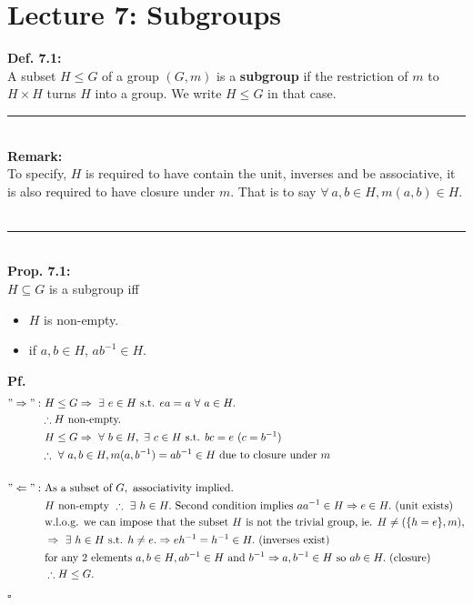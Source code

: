 \documentclass{article}
\begin{document}
\section{Lecture 7: Subgroups}
\textbf{Def. 7.1:}\\
A subset $H\leq G$ of a group $(G,m)$ is a \textbf{subgroup} if the restriction of $m$ to $H\times H$ turns $H$ into a group. We write $H\leq  G$ in that case.
\vspace{2mm}~\\
\hrule
\vspace{2mm}~\\
\textbf{Remark:}\\
To specify, $H$ is required to have contain the unit, inverses and be associative, it is also required to have closure under $m$. That is to say $\forall ~a,b\in H,m(a,b)\in H$.
\vspace{2mm}~\\
\hrule
\vspace{2mm}~\\
\textbf{Prop. 7.1:}\\
$H\subseteq G$ is a subgroup iff
\begin{itemize}
\item $H$ is non-empty.
\item if $a,b\in H$, $ab^{-1}\in H$.
\end{itemize}
\textbf{Pf.}
\begin{align*}
"\Rightarrow":&~H\leq G\Rightarrow ~\exists~ e\in H\text{ s.t. } ea=a~\forall~a\in H.\\
&\therefore H\text{ non-empty.}\\
&~H\leq G\Rightarrow ~\forall ~ b\in H,~\exists~c\in H\text{ s.t. }bc=e~(c=b^{-1})\\
&\therefore ~\forall~ a,b\in H,m(a,b^{-1})=ab^{-1}\in H\text{ due to closure under } m\\
~\\
"\Leftarrow":& \text{ As a subset of } G,\text{ associativity implied.}\\
&~ H \text{ non-empty } \therefore ~\exists~h\in H.\text{ Second condition implies } aa^{-1}\in H\Rightarrow e\in H.\text{ (unit exists)}\\
&\text{ w.l.o.g. we can impose that the subset }H\text{ is not the trivial group, ie. }H\neq(\lbrace h=e\rbrace,m),\\
&~\Rightarrow ~\exists~h\in H\text{ s.t. } h\neq e.\Rightarrow eh^{-1}=h^{-1}\in H.\text{ (inverses exist)}\\
&~\text{for any 2 elements } a,b\in H, ab^{-1}\in H\text{ and } b^{-1}\Rightarrow a,b^{-1}\in H\text{ so } ab\in H. \text{ (closure)}\\
&~\therefore H\leq G.
\end{align*}
\begin{flushright}
$\square$
\end{flushright}
\end{document}
